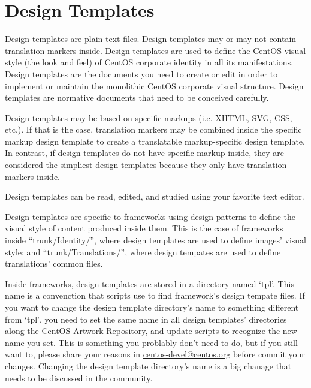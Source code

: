 
\section{Design Templates}
\hypertarget{sec:Concepts:Frameworks:Templates}{}
\label{sec:Concepts:Frameworks:Templates}

Design templates are plain text files. Design templates may or may not
contain translation markers inside.  Design templates are used to
define the CentOS visual style (the look and feel) of CentOS corporate
identity in all its manifestations.  Design templates are the
documents you need to create or edit in order to implement or maintain
the monolithic CentOS corporate visual structure.  Design templates
are normative documents that need to be conceived carefully.

Design templates may be based on specific markups (i.e. XHTML, SVG,
CSS, etc.). If that is the case, translation markers may be combined
inside the specific markup design template to create a translatable
markup-specific design template. In contrast, if design templates do
not have specific markup inside, they are considered the simpliest
design templates because they only have translation markers inside.

Design templates can be read, edited, and studied using your favorite
text editor. 

Design templates are specific to frameworks using design patterns to
define the visual style of content produced inside them.  This is the
case of frameworks inside ``trunk/Identity/'', where design templates
are used to define images' visual style; and ``trunk/Translations/'',
where design tempates are used to define translations' common files.

Inside frameworks, design templates are stored in a directory named
`tpl'. This name is a convenction that scripts use to find framework's
design tempate files. If you want to change the design template
directory's name to something different from `tpl', you need to set
the same name in all design templates' directories along the CentOS
Artwork Repository, and update scripts to recognize the new name you
set.  This is something you problably don't need to do, but if you
still want to, please share your reasons in
\href{mailto:centos-devel@centos.org}{centos-devel@centos.org} before
commit your changes. Changing the design template directory's name is
a big chanage that needs to be discussed in the community.

